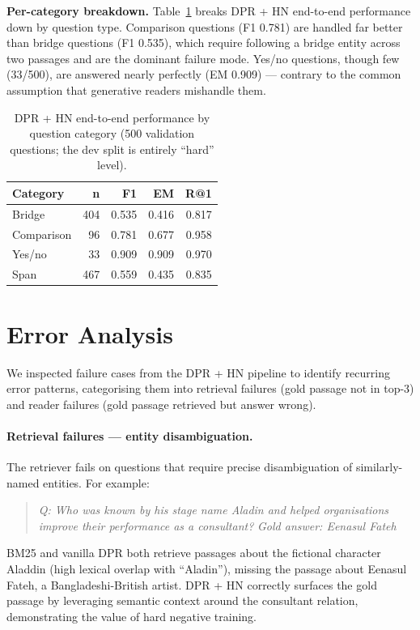 \documentclass{llncs}
\begin{document}
\noindent\textbf{Per-category breakdown.}
Table~\ref{tab:breakdown} breaks DPR + HN end-to-end performance down by
question type. Comparison questions (F1 0.781) are handled far better than
bridge questions (F1 0.535), which require following a bridge entity across two
passages and are the dominant failure mode. Yes/no questions, though few
(33/500), are answered nearly perfectly (EM 0.909) --- contrary to the common
assumption that generative readers mishandle them.

\begin{table}[t]
\centering
\caption{DPR + HN end-to-end performance by question category (500 validation
questions; the dev split is entirely ``hard'' level).}
\label{tab:breakdown}
\begin{tabular}{lrrrr}
\toprule
\textbf{Category} & \textbf{n} & \textbf{F1} & \textbf{EM} & \textbf{R@1} \\
\midrule
Bridge      & 404 & 0.535 & 0.416 & 0.817 \\
Comparison  &  96 & 0.781 & 0.677 & 0.958 \\
Yes/no      &  33 & 0.909 & 0.909 & 0.970 \\
Span        & 467 & 0.559 & 0.435 & 0.835 \\
\bottomrule
\end{tabular}
\end{table}

\section{Error Analysis}

We inspected failure cases from the DPR + HN pipeline to identify
recurring error patterns, categorising them into retrieval failures (gold
passage not in top-3) and reader failures (gold passage retrieved but answer
wrong).

\paragraph{Retrieval failures --- entity disambiguation.}
The retriever fails on questions that require precise disambiguation of
similarly-named entities. For example:
\begin{quote}
\small
\textit{Q: Who was known by his stage name Aladin and helped organisations
improve their performance as a consultant?} \quad
\textit{Gold answer: Eenasul Fateh}
\end{quote}
BM25 and vanilla DPR both retrieve passages about the fictional character
Aladdin (high lexical overlap with ``Aladin''), missing the passage about
Eenasul Fateh, a Bangladeshi-British artist. DPR + HN correctly surfaces
the gold passage by leveraging semantic context around the consultant
relation, demonstrating the value of hard negative training.
\end{document}
